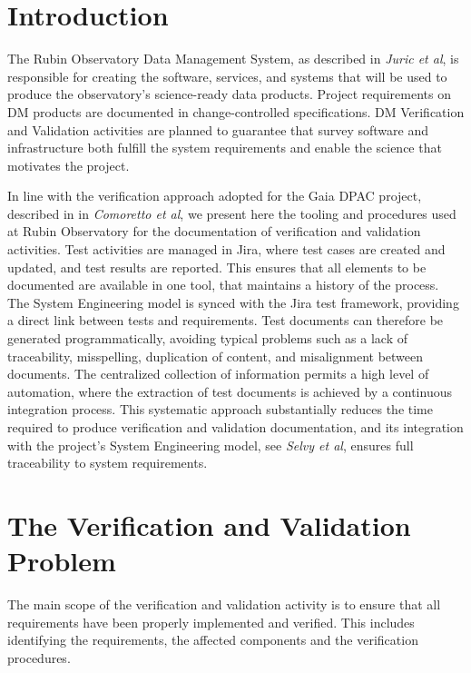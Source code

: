 \section{Introduction}

The Rubin Observatory Data Management System, as described in \textit{Juric et al}\cite{2015arXiv151207914J},
is responsible for creating the software, services, and systems that will be used to
produce the observatory's science-ready data products.  Project requirements on DM
products are documented in change-controlled specifications. DM Verification and Validation activities are planned
to guarantee that survey software and infrastructure both fulfill the system requirements and enable the science that
motivates the project.

In line with the verification approach adopted for the Gaia DPAC project, described in in \textit{Comoretto et al}\cite{10.1117/12.926797}, 
we present here the tooling and procedures used at Rubin Observatory for the documentation of verification and
validation activities. Test activities are managed in Jira, where test cases are created and updated, and test results
are reported. This ensures that all elements to be documented are available in one tool, that maintains a history of
the process. The System Engineering model is synced with the Jira test framework, providing a direct link between
tests and requirements. Test documents can therefore be generated programmatically, avoiding typical problems
such as a lack of traceability, misspelling, duplication of content, and misalignment between documents. The
centralized collection of information permits a high level of automation, where the extraction of test documents is
achieved by a continuous integration process. This systematic approach substantially reduces the time required to
produce verification and validation documentation, and its integration with the project's System Engineering model, 
see \textit{Selvy et al}\cite{10.1117/12.2310125}, ensures full traceability to system requirements.


\section{The Verification and Validation Problem}

The main scope of the verification and validation activity is to ensure that all requirements have been properly implemented and verified.
This includes identifying the requirements, the affected components and the verification procedures.

